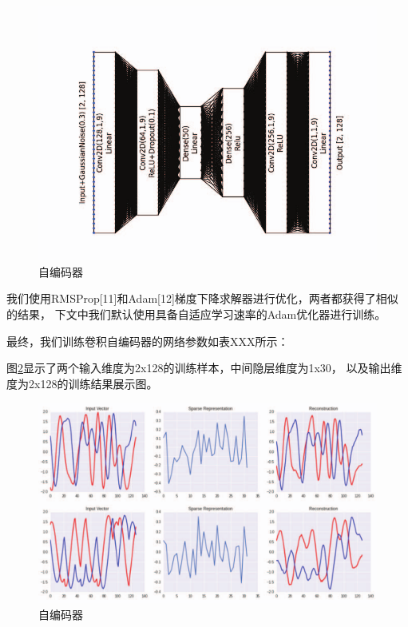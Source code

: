 \begin{figure}[!h]
	\centering
	\includegraphics[scale=0.3]{figures/chapter_3/CAE}
	\caption{自编码器}	\label{sec:fig_3_3}
\end{figure}

我们使用RMSProp[11]和Adam[12]梯度下降求解器进行优化，两者都获得了相似的结果，
下文中我们默认使用具备自适应学习速率的Adam优化器进行训练。\par

最终，我们训练卷积自编码器的网络参数如表XXX所示：

图\ref{sec:fig_3_4}显示了两个输入维度为2x128的训练样本，中间隐层维度为1x30，
以及输出维度为2x128的训练结果展示图。\par
\begin{figure}[!h]
	\centering
	\includegraphics[scale=0.2]{figures/chapter_3/examples_cae}
	\caption{自编码器}	\label{sec:fig_3_4}
\end{figure} 

